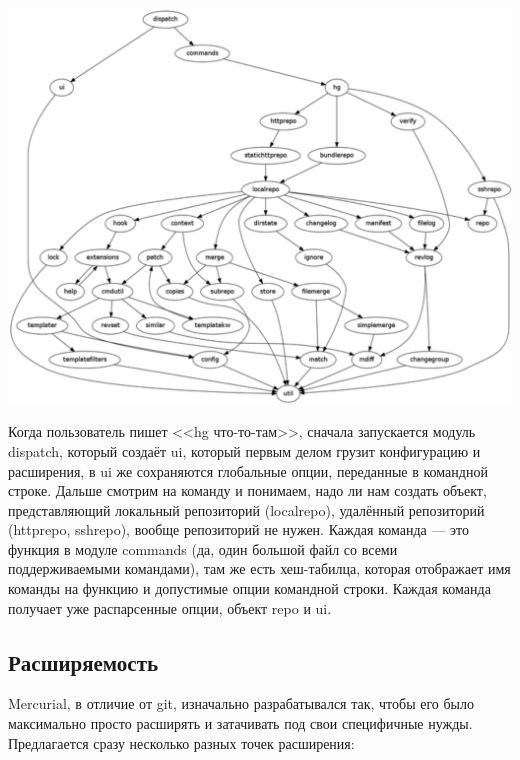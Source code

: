 \documentclass{../../text-style}
\begin{document}
\begin{center}
    \includegraphics[width=\textwidth]{mercurialImportGraph.png}
\end{center}

Когда пользователь пишет <<hg что-то-там>>, сначала запускается модуль dispatch, который создаёт ui, который первым делом грузит конфигурацию и расширения, в ui же сохраняются глобальные опции, переданные в командной строке. Дальше смотрим на команду и понимаем, надо ли нам создать объект, представляющий локальный репозиторий (localrepo), удалённый репозиторий (httprepo, sshrepo), вообще репозиторий не нужен. Каждая команда --- это функция в модуле commands (да, один большой файл со всеми поддерживаемыми командами), там же есть хеш-табилца, которая отображает имя команды на функцию и допустимые опции командной строки. Каждая команда получает уже распарсенные опции, объект repo и ui.

\subsection{Расширяемость}

Mercurial, в отличие от git, изначально разрабатывался так, чтобы его было максимально просто расширять и затачивать под свои специфичные нужды. Предлагается сразу несколько разных точек расширения:
\end{document}
